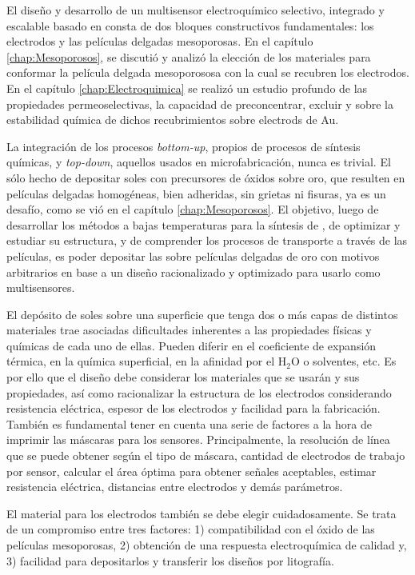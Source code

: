 	El diseño y desarrollo de un multisensor electroquímico selectivo, integrado y escalable basado en \pdm\space consta de dos bloques constructivos fundamentales: los electrodos y las películas delgadas mesoporosas. En el capítulo \ref{chap:Mesoporosos}, se discutió y analizó la elección de los materiales para conformar la película delgada mesoporososa con la cual se recubren los electrodos. En el capítulo \ref{chap:Electroquimica} se realizó un estudio profundo de las propiedades permeoselectivas, la capacidad de preconcentrar, excluir y sobre la estabilidad química de dichos recubrimientos sobre electrods de Au.

	La integración de los procesos \textit{bottom-up}, propios de procesos de síntesis químicas, y \textit{top-down}, aquellos usados en microfabricación, nunca es trivial. El sólo hecho de depositar soles con precursores de óxidos sobre oro, que resulten en películas delgadas homogéneas, bien adheridas, sin grietas ni fisuras, ya es un desafío, como se vió en el capítulo \ref{chap:Mesoporosos}. El objetivo, luego de desarrollar los métodos a bajas temperaturas para la síntesis de \pdm, de optimizar y estudiar su estructura, y de comprender los procesos de transporte a través de las películas, es poder depositar las \pdm\space sobre películas delgadas de oro con motivos arbitrarios en base a un diseño racionalizado y optimizado para usarlo como multisensores. 

	El depósito de soles sobre una superficie que tenga dos o más capas de distintos  materiales trae asociadas dificultades inherentes a las propiedades físicas y químicas de cada uno de ellas. Pueden diferir en el coeficiente de expansión térmica, en la química superficial, en la afinidad por el H$_2$O o solventes, etc.
	Es por ello que el diseño debe considerar los materiales que se usarán y sus propiedades, así como racionalizar la estructura de los electrodos considerando resistencia eléctrica, espesor de los electrodos y facilidad para la fabricación. También es fundamental tener en cuenta una serie de factores a la hora de imprimir las máscaras para los sensores. Principalmente, la resolución de línea que se puede obtener según el tipo de máscara, cantidad de electrodos de trabajo por sensor, calcular el área óptima para obtener señales aceptables, estimar resistencia eléctrica, distancias entre electrodos y demás parámetros.

	El material para los electrodos también se debe elegir cuidadosamente. Se trata de un compromiso entre tres factores: 1) compatibilidad con el óxido de las películas mesoporosas, 2) obtención de una respuesta electroquímica de calidad y, 3) facilidad para depositarlos y transferir los diseños por litografía.

